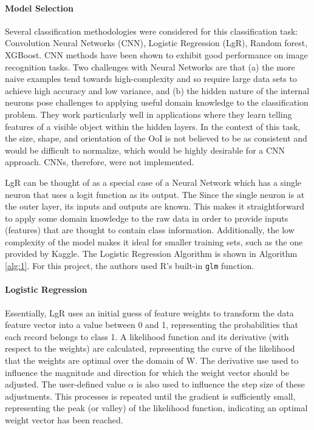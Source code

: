 \documentclass[fleqn,10pt]{SelfArx} %
\begin{document}
\paragraph{Model Selection} Several classification methodologies were considered for this classification task: Convolution Neural Networks (CNN), Logistic Regression (LgR), Random forest, XGBoost.  CNN methods have been shown to exhibit good performance on image recognition tasks. \cite{NIPS2012_4824} \cite{behnke}  Two challenges with Neural Networks are that (a) the more naive examples tend towards high-complexity and so require large data sets to achieve high accuracy and low variance, and (b) the hidden nature of the internal neurons pose challenges to applying useful domain knowledge to the classification problem.  They work particularly well in applications where they learn telling features of a visible object within the hidden layers. In the context of this task, the size, shape, and orientation of the OoI is not believed to be as consistent and would be difficult to normalize, which would be highly desirable for a CNN approach.  CNNs, therefore, were not implemented. \cite{lecun}

LgR can be thought of as a special case of a Neural Network which has a single neuron that uses a logit function as its output.  The Since the single neuron is at the outer layer, its inputs and outputs are known.  This makes it straightforward to apply some domain knowledge to the raw data in order to provide inputs (features) that are thought to contain class information.  Additionally, the low complexity of the model makes it ideal for smaller training sets, such as the one provided by Kaggle. \cite{mccullagh} \cite{lim} The Logistic Regression Algorithm is shown in Algorithm \ref{alg:1}.  For this project, the authors used R's built-in \texttt{glm} function.

\paragraph{Logistic Regression} Essentially, LgR uses an initial guess of feature weights to transform the data feature vector into a value between 0 and 1, representing the probabilities that each record belongs to class 1.  A likelihood function and its derivative (with respect to the weights) are calculated, representing the curve of the likelihood that the weights are optimal over the domain of W.  The derivative use used to influence the magnitude and direction for which the weight vector should be adjusted.  The user-defined value $\alpha$ is also used to influence the step size of these adjustments.  This processes is repeated until the gradient is sufficiently small, representing the peak (or valley) of the likelihood function, indicating an optimal weight vector has been reached.
\end{document}
